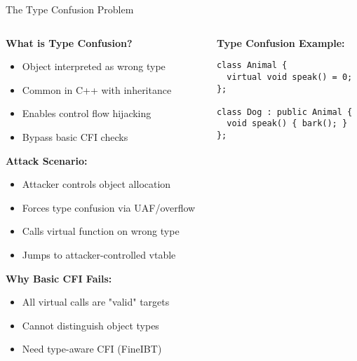 \documentclass[aspectratio=169,12pt]{beamer}
\begin{document}
\begin{frame}[fragile]{The Type Confusion Problem}
    \begin{columns}
        \begin{column}{0.5\textwidth}
            \textbf{What is Type Confusion?}
            \begin{itemize}
                \item Object interpreted as wrong type
                \item Common in C++ with inheritance
                \item Enables control flow hijacking
                \item Bypass basic CFI checks
            \end{itemize}
            
            \vspace{0.3cm}
            \textbf{Attack Scenario:}
            \begin{itemize}
                \item Attacker controls object allocation
                \item Forces type confusion via UAF/overflow
                \item Calls virtual function on wrong type
                \item Jumps to attacker-controlled vtable
            \end{itemize}
            
            \vspace{0.3cm}
            \textbf{Why Basic CFI Fails:}
            \begin{itemize}
                \item All virtual calls are "valid" targets
                \item Cannot distinguish object types
                \item Need type-aware CFI (FineIBT)
            \end{itemize}
        \end{column}
        \begin{column}{0.5\textwidth}
            \begin{tcolorbox}[colback=gray!10]
                \small
                \textbf{Type Confusion Example:}
                \begin{verbatim}
class Animal {
  virtual void speak() = 0;
};

class Dog : public Animal {
  void speak() { bark(); }
};


\end{verbatim}
\end{tcolorbox}
\end{column}
\end{columns}
\end{frame}
\end{document}
